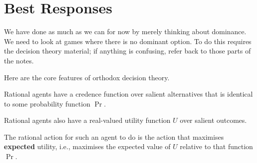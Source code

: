 \chapter{Best Responses}

We have done as much as we can for now by merely thinking about dominance. We need to look at games where there is no dominant option. To do this requires the decision theory material; if anything is confusing, refer back to those parts of the notes.

Here are the core features of orthodox decision theory.

\begin{itemize*}
\item Rational agents have a credence function over salient alternatives that is identical to some probability function $\Pr$.
\item Rational agents also have a real-valued utility function $U$ over salient outcomes.
\item The rational action for such an agent to do is the action that maximises \textbf{expected} utility, i.e., maximises the expected value of $U$ relative to that function $\Pr$.
\end{itemize*}

